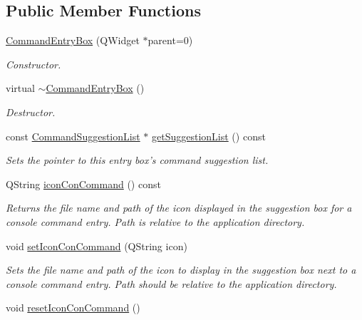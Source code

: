 \subsection*{Public Member Functions}
\begin{DoxyCompactItemize}
\item 
\hyperlink{class_command_entry_box_a75c9cb2fee4e0034bc114222fa890e3b}{Command\-Entry\-Box} (Q\-Widget $\ast$parent=0)
\begin{DoxyCompactList}\small\item\em Constructor. \end{DoxyCompactList}\item 
\hypertarget{class_command_entry_box_a66f323c649a34cc167f124069aa5de53}{virtual \hyperlink{class_command_entry_box_a66f323c649a34cc167f124069aa5de53}{$\sim$\-Command\-Entry\-Box} ()}\label{class_command_entry_box_a66f323c649a34cc167f124069aa5de53}

\begin{DoxyCompactList}\small\item\em Destructor. \end{DoxyCompactList}\item 
const \hyperlink{class_command_suggestion_list}{Command\-Suggestion\-List} $\ast$ \hyperlink{class_command_entry_box_ae00fdd5b4cbf8fc825e5333f3ae47dad}{get\-Suggestion\-List} () const 
\begin{DoxyCompactList}\small\item\em Sets the pointer to this entry box's command suggestion list. \end{DoxyCompactList}\item 
Q\-String \hyperlink{class_command_entry_box_a4ff50a0239789c705b15a395cd1d3a68}{icon\-Con\-Command} () const 
\begin{DoxyCompactList}\small\item\em Returns the file name and path of the icon displayed in the suggestion box for a console command entry. Path is relative to the application directory. \end{DoxyCompactList}\item 
void \hyperlink{class_command_entry_box_a5fc40503d8f9b6bf8faddc42ff6663bb}{set\-Icon\-Con\-Command} (Q\-String icon)
\begin{DoxyCompactList}\small\item\em Sets the file name and path of the icon to display in the suggestion box next to a console command entry. Path should be relative to the application directory. \end{DoxyCompactList}\item 
\hypertarget{class_command_entry_box_a9807265bf78369d6dfbc8210aa39c562}{void \hyperlink{class_command_entry_box_a9807265bf78369d6dfbc8210aa39c562}{reset\-Icon\-Con\-Command} ()}\label{class_command_entry_box_a9807265bf78369d6dfbc8210aa39c562}


\end{DoxyCompactItemize}
